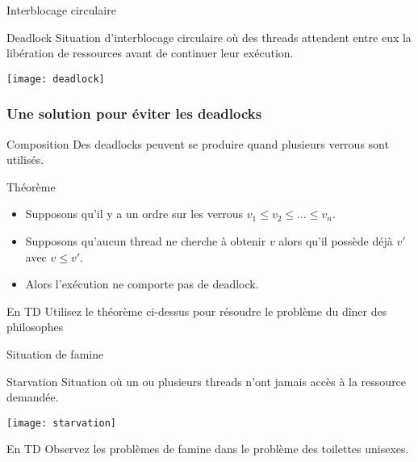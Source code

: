 \begin{frame}{Interblocage circulaire}
    \begin{block}{Deadlock}
      Situation  d'\alert{interblocage circulaire}  où  des threads  attendent
      entre eux la libération de ressources avant de continuer leur exécution.
    \end{block}
      \begin{center}
        \texttt{[image: deadlock]}
      \end{center}
\end{frame}

\begin{frame}
  \frametitle{Une solution pour éviter les deadlocks}
\vFill
  \begin{alertblock}{Composition}
    Des deadlocks peuvent se produire quand plusieurs verrous sont utilisés.
  \end{alertblock}
\vFill
  \begin{block}{Théorème}
    \begin{itemize}
    \item Supposons qu'il y a un ordre sur les verrous $v_1 \le v_2 \le \dots \le v_n$.
    \item Supposons qu'aucun thread ne cherche à obtenir $v$ alors qu'il possède déjà $v'$ avec $v\le v'$.
    \item Alors l'exécution ne comporte pas de deadlock.
    \end{itemize}
  \end{block}

\vFill
  \begin{alertblock}{En TD}
    Utilisez le théorème ci-dessus pour résoudre le problème du dîner des philosophes
  \end{alertblock}
\vFill
\end{frame}

\begin{frame}{Situation de famine}
  \vFill
  \begin{block}{Starvation}
    Situation où un ou  plusieurs threads n'ont \alert{jamais accès}
    à la ressource demandée.
  \end{block}
  \vFill
  \begin{center}
    \texttt{[image: starvation]}
  \end{center}      
  \vFill
  \begin{alertblock}{En TD}
    Observez les problèmes de famine dans le problème des toilettes unisexes.
  \end{alertblock}
  \vFill
\end{frame}


